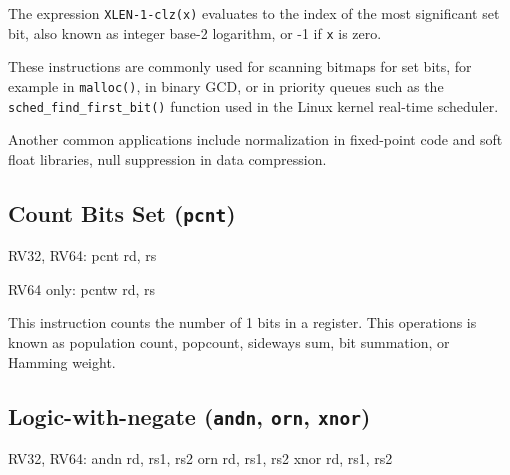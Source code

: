 

The expression {\tt XLEN-1-clz(x)} evaluates to the index of the most significant
set bit, also known as integer base-2 logarithm, or -1 if {\tt x} is zero.

These instructions are commonly used for scanning bitmaps for set bits, for
example in {\tt malloc()}, in binary GCD, or in priority queues such as the
{\tt sched\_find\_first\_bit()} function used in the Linux kernel real-time
scheduler.

Another common applications include normalization in fixed-point code and soft
float libraries, null suppression in data compression.

%
%


\subsection{Count Bits Set (\texttt{pcnt})}

\begin{rvb}
  RV32, RV64:
    pcnt rd, rs

  RV64 only:
    pcntw rd, rs
\end{rvb}

This instruction counts the number of 1 bits in a register. This operations is known as
population count, popcount, sideways sum, bit summation, or Hamming weight.~\cite{HammingWeight,Warren12}




\subsection{Logic-with-negate (\texttt{andn}, \texttt{orn}, \texttt{xnor})}

\begin{rvb}
  RV32, RV64:
    andn rd, rs1, rs2
    orn  rd, rs1, rs2
    xnor rd, rs1, rs2
\end{rvb}

